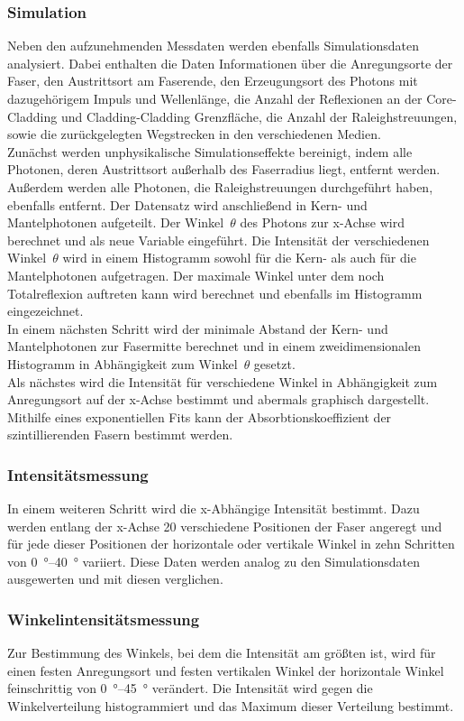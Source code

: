 \subsubsection{Simulation}
Neben den aufzunehmenden Messdaten werden ebenfalls Simulationsdaten analysiert. Dabei enthalten die Daten Informationen über die Anregungsorte der Faser, den Austrittsort
am Faserende, den Erzeugungsort des Photons mit dazugehörigem Impuls und Wellenlänge, die Anzahl der Reflexionen an der Core-Cladding und Cladding-Cladding Grenzfläche, die
Anzahl der Raleighstreuungen, sowie die zurückgelegten Wegstrecken in den verschiedenen Medien. \\
Zunächst werden unphysikalische Simulationseffekte bereinigt, indem alle Photonen, deren Austrittsort außerhalb des Faserradius liegt, entfernt werden. Außerdem 
werden alle Photonen, die Raleighstreuungen durchgeführt haben, ebenfalls entfernt. Der Datensatz wird anschließend in Kern- und Mantelphotonen aufgeteilt. Der Winkel~$\theta$
des Photons zur x-Achse wird berechnet und als neue Variable eingeführt. Die Intensität der verschiedenen Winkel~$\theta$ wird in einem Histogramm sowohl für die Kern- als auch 
für die Mantelphotonen aufgetragen. Der maximale Winkel unter dem noch Totalreflexion auftreten kann wird berechnet und ebenfalls im Histogramm eingezeichnet. \\
In einem nächsten Schritt wird der minimale Abstand der Kern- und Mantelphotonen zur Fasermitte berechnet und in einem zweidimensionalen Histogramm in Abhängigkeit zum Winkel~$\theta$
gesetzt. \\
Als nächstes wird die Intensität für verschiedene Winkel in Abhängigkeit zum Anregungsort auf der x-Achse bestimmt und abermals graphisch dargestellt. Mithilfe eines
exponentiellen Fits kann der Absorbtionskoeffizient der szintillierenden Fasern bestimmt werden.

\subsubsection{Intensitätsmessung}
In einem weiteren Schritt wird die x-Abhängige Intensität bestimmt. Dazu werden entlang der x-Achse 20 verschiedene Positionen der Faser angeregt und für jede dieser
Positionen der horizontale oder vertikale Winkel in zehn Schritten von \qtyrange{0}{40}{\degree} variiert. Diese Daten werden analog zu den Simulationsdaten ausgewerten und 
mit diesen verglichen.

\subsubsection{Winkelintensitätsmessung}
Zur Bestimmung des Winkels, bei dem die Intensität am größten ist, wird für einen festen Anregungsort und festen vertikalen Winkel der horizontale Winkel feinschrittig von
\qtyrange{0}{45}{\degree} verändert. Die Intensität wird gegen die Winkelverteilung histogrammiert und das Maximum dieser Verteilung bestimmt.